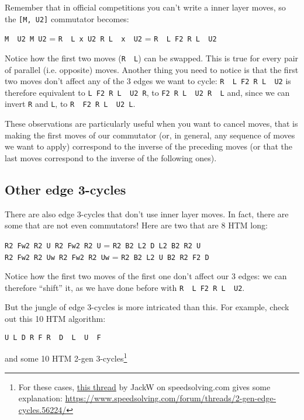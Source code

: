 \documentclass[11pt,a4paper]{book}
\newcommand{\p}{\textquotesingle}
\newcommand{\m}{\texttt}
\newcommand{\ps}{\p\,\,}
\begin{document}
Remember that in official competitions you can't write a inner layer moves, so the \m{[M\p, U2]} commutator becomes:

\begin{center}
\m{M\ps U2 M U2} = \m{R\ps L x U2 R L\ps x\ps U2} = \m{R\ps L F2 R L\ps U2}
\end{center}

Notice how the first two moves (\m{R\ps L}) can be swapped. This is true for every pair of parallel (i.e. opposite) moves.
Another thing you need to notice is that the first two moves don't affect any of the 3 edges we want to cycle: \m{R\ps L F2 R L\ps U2} is therefore equivalent to \m{L F2 R L\ps U2 R\p}, to \m{F2 R L\ps U2 R\ps L} and, since we can invert \m{R\p} and \m L, to \m{R\ps F2 R L\ps U2 L}.

These observations are particularly useful when you want to cancel moves, that is making the first moves of our commutator (or, in general, any sequence of moves we want to apply) correspond to the inverse of the preceding moves (or that the last moves correspond to the inverse of the following ones).

\subsection{Other edge 3-cycles}
\label{other-edge}

There are also edge 3-cycles that don't use inner layer moves. In fact, there are some that are not even commutators! Here are two that are 8 HTM long:

\begin{center}
\m{R2 Fw2 R2 U R2 Fw2 R2 U} = \m{R2 B2 L2 D L2 B2 R2 U}\\
\m{R2 Fw2 R2 Uw R2 Fw2 R2 Uw} = \m{R2 B2 L2 U B2 R2 F2 D}
\end{center}

Notice how the first two moves of the first one don't affect our 3 edges: we can therefore ``shift'' it, as we have done before with \m{R\ps L F2 R L\ps U2}.

But the jungle of edge 3-cycles is more intricated than this. For example, check out this 10 HTM algorithm:

\begin{center}
\m{U L D R F R\ps D\ps L\ps U\ps F\p}
\end{center}

and some 10 HTM 2-gen 3-cycles\footnote{For these cases, \href{https://www.speedsolving.com/forum/threads/2-gen-edge-cycles.56224/}{this thread} by JackW on speedsolving.com gives some explanation: \url{https://www.speedsolving.com/forum/threads/2-gen-edge-cycles.56224/}}
\end{document}
